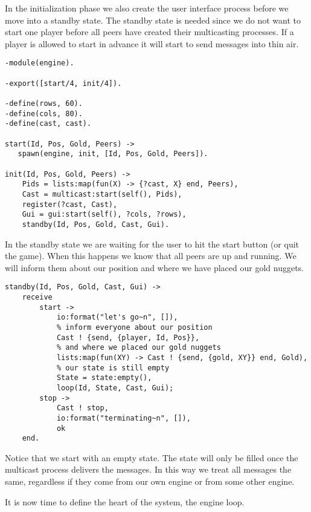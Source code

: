 \documentclass[a4paper,11pt]{article}
\begin{document}
In the initialization phase we also create the user interface process before we 
move into a standby state. The standby state is needed since we do not
want to start one player before all peers have created their
multicasting processes. If a player is allowed to start in advance it
will start to send messages into thin air.

\begin{verbatim}
-module(engine).

-export([start/4, init/4]).

-define(rows, 60).
-define(cols, 80).
-define(cast, cast).

start(Id, Pos, Gold, Peers) ->
   spawn(engine, init, [Id, Pos, Gold, Peers]).

init(Id, Pos, Gold, Peers) ->
    Pids = lists:map(fun(X) -> {?cast, X} end, Peers),
    Cast = multicast:start(self(), Pids),
    register(?cast, Cast),
    Gui = gui:start(self(), ?cols, ?rows),
    standby(Id, Pos, Gold, Cast, Gui).
\end{verbatim}

In the standby state we are waiting for the user to hit the start
button (or quit the game). When this happens we know that all peers
are up and running. We will inform them about our position and where
we have placed our gold nuggets.

\begin{verbatim}
standby(Id, Pos, Gold, Cast, Gui) ->
    receive 
        start ->
            io:format("let's go~n", []),
            % inform everyone about our position
            Cast ! {send, {player, Id, Pos}},
            % and where we placed our gold nuggets
            lists:map(fun(XY) -> Cast ! {send, {gold, XY}} end, Gold),
            % our state is still empty
            State = state:empty(),
            loop(Id, State, Cast, Gui);
        stop ->
            Cast ! stop,
            io:format("terminating~n", []),
            ok
    end.
\end{verbatim}

Notice that we start with an empty state. The state will only be
filled once the multicast process delivers the messages. In this way
we treat all messages the same, regardless if they come from our own
engine or from some other engine.

It is now time to define the heart of the system, the engine loop. 
\end{document}
